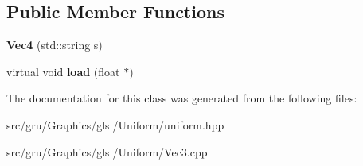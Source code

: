 \subsection*{\-Public \-Member \-Functions}
\begin{DoxyCompactItemize}
\item 
\hypertarget{classglutpp_1_1glsl_1_1Uniform_1_1Scalar_1_1Vec4_a8b52456370b21ebba1c6aa17b755c669}{{\bfseries \-Vec4} (std\-::string s)}\label{classglutpp_1_1glsl_1_1Uniform_1_1Scalar_1_1Vec4_a8b52456370b21ebba1c6aa17b755c669}

\item 
\hypertarget{classglutpp_1_1glsl_1_1Uniform_1_1Scalar_1_1Vec4_a4c000d4d4cffd1df892ed2f528c6931e}{virtual void {\bfseries load} (float $\ast$)}\label{classglutpp_1_1glsl_1_1Uniform_1_1Scalar_1_1Vec4_a4c000d4d4cffd1df892ed2f528c6931e}

\end{DoxyCompactItemize}


\-The documentation for this class was generated from the following files\-:\begin{DoxyCompactItemize}
\item 
src/gru/\-Graphics/glsl/\-Uniform/uniform.\-hpp\item 
src/gru/\-Graphics/glsl/\-Uniform/\-Vec3.\-cpp\end{DoxyCompactItemize}

